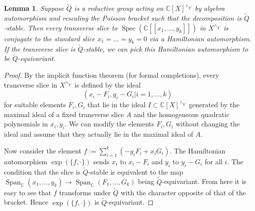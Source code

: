 \documentclass[12pt]{amsart}
\newcommand{\C}{\mathbb{C}}
\newtheorem{Lem}[Thm]{Lemma}
\theoremstyle{definition}
\numberwithin{equation}{section}
\begin{document}
\begin{Lem}\label{Lem:slice_well_defined}
Suppose $\tilde{Q}$ is a reductive group acting on $\C[X]^{\wedge_{\chi'}}$ by algebra automorphism
and rescaling the Poisson bracket such that the decomposition is $\tilde{Q}$-stable. Then every transverse slice to $\operatorname{Spec}(\C[[x_1,\ldots,y_k]])$ in $X^{\wedge_{\chi'}}$ is conjugate
to the standard slice $x_1=\ldots=y_k=0$ via a  Hamiltonian
automorphism. If the transverse slice is $\tilde{Q}$-stable, we can pick this
Hamiltonian automorphism to be  $\tilde{Q}$-equivariant.
\end{Lem}
\begin{proof}
By the implicit function theorem (for formal completions), every transverse slice
in $X^{\wedge_{\chi'}}$ is defined by the ideal
$$(x_i-F_i, y_i-G_i| i=1,\ldots,k)$$
for suitable elements $F_i,G_i$ that lie in the ideal $I\subset \C[X]^{\wedge_{\chi'}}$ generated by the maximal ideal of a fixed transverse slice $A$
and the homogeneous quadratic polynomials in $x_i,y_i$. We can modify the elements $F_i,G_i$
without changing the ideal and assume that they actually lie in the maximal ideal of $A$.

Now consider the element $f:=\sum_{i=1}^k (-y_i F_i+x_i G_i)$. The Hamiltonian automorphism
$\exp(\{f,\cdot\})$ sends $x_i$ to $x_i-F_i$ and $y_i$ to $y_i-G_i$ for all $i$. The condition
that the slice is $\tilde{Q}$-stable is equivalent to the map $\operatorname{Span}_\C(x_1,\ldots,y_k)
\rightarrow \operatorname{Span}_\C(F_1,\ldots,G_k)$ being $\tilde{Q}$-equivariant. From here it is
easy to see that $f$ transforms under $\tilde{Q}$ with the character opposite of that of the bracket.
Hence $\exp(\{f,\cdot\})$ is $\tilde{Q}$-equivariant.
\end{proof}
\end{document}
